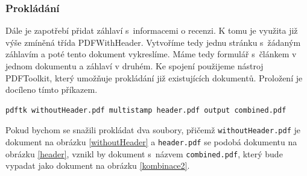 \documentclass[czech,BP]{thesiskiv}
\begin{document}
\subsubsection{Prokládání}
Dále je zapotřebí přidat záhlaví s~informacemi o recenzi. K tomu je využita již výše zmíněná třída PDFWithHeader. Vytvoříme tedy jednu stránku s~žádaným záhlavím a poté tento dokument vykreslíme. Máme tedy formulář s~článkem v jednom dokumentu a záhlaví v druhém. Ke spojení použijeme nástroj PDFToolkit, který umožňuje prokládání již existujících dokumentů. Proložení je docíleno tímto příkazem. 
\begin{lstlisting}
pdftk withoutHeader.pdf multistamp header.pdf output combined.pdf
\end{lstlisting}
Pokud bychom se snažili prokládat dva soubory, přičemž \texttt{withoutHeader.pdf} je dokument na obrázku \ref{withoutHeader} a \texttt{header.pdf} se podobá dokumentu na obrázku \ref{header}, vznikl by dokument s~názvem \texttt{combined.pdf}, který bude vypadat jako dokument na obrázku \ref{kombinace2}.
\end{document}
